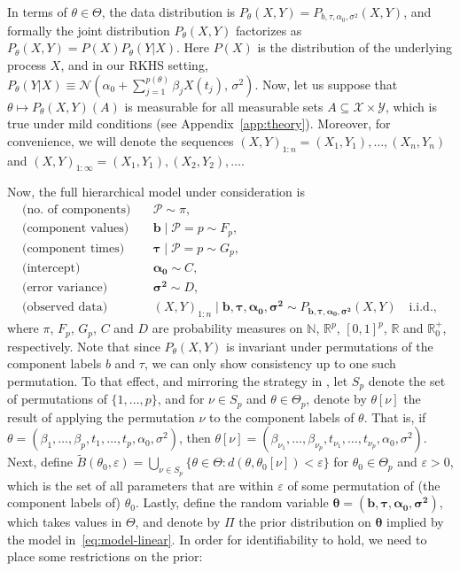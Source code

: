 \documentclass{article}
\numberwithin{equation}{section}
\theoremstyle{plain}
\theoremstyle{definition}
\renewcommand{\epsilon}{\varepsilon}
\newcommand{\N}{\mathbb{N}}
\newcommand{\R}{\mathbb{R}}
\begin{document}
In terms of \(\theta\in\Theta\), the data distribution is \(P_\theta(X,Y)=P_{b, \tau, \alpha_0, \sigma^2}(X,Y)\), and formally the joint distribution \(P_{\theta}(X,Y)\) factorizes as \(P_{\theta}(X,Y)=P(X)P_\theta(Y|X)\). Here \(P(X)\) is the distribution of the underlying process \(X\), and in our RKHS setting, \(P_\theta(Y|X) \equiv \mathcal N(\alpha_0 + \sum_{j=1}^{p(\theta)}\beta_j X(t_j),\, \sigma^2)\). Now, let us suppose that \(\theta\mapsto P_\theta(X, Y)(A)\) is measurable for all measurable sets \(A\subseteq \mathcal X\times \mathcal Y\), which is true under mild conditions (see Appendix~\ref{app:theory}). Moreover, for convenience, we will denote the sequences \((X,Y)_{1:n} = (X_1,Y_1), \dots, (X_n, Y_n)\) and \((X,Y)_{1:\infty} = (X_1, Y_1), (X_2, Y_2), \dots\).

Now, the full hierarchical model under consideration is
\begin{equation}\label{eq:model-linear}
  \begin{aligned}
    \text{(no.\ of components)}\quad & \mathcal P \sim \pi,\\
    \text{(component values)}\quad   & \bm b \mid \mathcal P=p \sim F_p,\\
    \text{(component times)}\quad    & \bm \tau \mid \mathcal P=p \sim G_p,\\
    \text{(intercept)}\quad          & \bm{\alpha_0} \sim C,\\
    \text{(error variance)}\quad     & \bm{\sigma^2} \sim D,\\
    \text{(observed data)}\quad      & (X,Y)_{1:n} \mid \bm{b, \tau, \alpha_0, \sigma^2} \sim P_{\bm{b, \tau, \alpha_0, \sigma^2}}(X,Y) \quad \text{i.i.d.},
  \end{aligned}
\end{equation}
where \(\pi\), \(F_p\), \(G_p\), \(C\) and \(D\) are probability measures on \(\N\), \(\R^p\), \([0,1]^p\), \(\R\) and \(\R^+_0\), respectively. Note that since \(P_\theta(X,Y)\) is invariant under permutations of the component labels \(b\) and \(\tau\), we can only show consistency up to one such permutation. To that effect, and mirroring the strategy in \citet{miller2023consistency}, let \(S_p\) denote the set of permutations of \(\{1,\dots,p\}\), and for \(\nu\in S_p\) and \(\theta \in \Theta_p\), denote by \(\theta[\nu]\) the result of applying the permutation \(\nu\) to the component labels of \(\theta\). That is, if \(\theta=(\beta_1,\dots,\beta_p, t_1,\dots, t_p,\alpha_0,\sigma^2)\), then \(\theta[\nu]=(\beta_{\nu_1},\dots,\beta_{\nu_p}, t_{\nu_1},\dots, t_{\nu_p},\alpha_0,\sigma^2)\). Next, define \(\tilde{B}(\theta_0, \epsilon)  =\bigcup_{\nu\in S_p} \{\theta \in \Theta: d(\theta, \theta_0[\nu]) < \epsilon \}\)  for \(\theta_0\in\Theta_p\) and \(\epsilon>0\), which is the set of all parameters that are within \(\epsilon\) of some permutation of (the component labels of) \(\theta_0\). Lastly, define the random variable \(\bm \theta = (\bm{b, \tau, \alpha_0, \sigma^2} )\), which takes values in \(\Theta\), and denote by \(\Pi\) the prior distribution on \(\bm\theta\) implied by the model in~\eqref{eq:model-linear}. In order for identifiability to hold, we need to place some restrictions on the prior:
\end{document}
